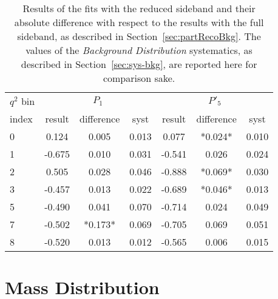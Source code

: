 \begin{table*}[htb]
  \caption{Results of the fits with the reduced sideband and their absolute difference with respect to the results with the full sideband, as described in Section~\ref{sec:partRecoBkg}.
    The values of the \textit{Background Distribution} systematics, as described in Section~\ref{sec:sys-bkg}, are reported here for comparison sake.\label{tab:red-sideband}}
          {\small
            \begin{center}
              \begin{tabular}{l|ccc|ccc}
                $q^2$ bin & \multicolumn{3}{c}{$P_1$} & \multicolumn{3}{c}{$P'_5$} \\
                index & result & difference & syst & result & difference & syst \\
                \hline
                0 &  0.124 & 0.005 & 0.013 &  0.077 &*0.024*& 0.010 \\
                1 & -0.675 & 0.010 & 0.031 & -0.541 & 0.026 & 0.024 \\
                2 &  0.505 & 0.028 & 0.046 & -0.888 &*0.069*& 0.030 \\
                3 & -0.457 & 0.013 & 0.022 & -0.689 &*0.046*& 0.013 \\
                5 & -0.490 & 0.041 & 0.070 & -0.714 & 0.024 & 0.049 \\
                7 & -0.502 &*0.173*& 0.069 & -0.705 & 0.069 & 0.051 \\
                8 & -0.520 & 0.013 & 0.012 & -0.565 & 0.006 & 0.015 \\
              \end{tabular}
            \end{center}
          }
\end{table*}



\section{Mass Distribution}
\label{sec:sys-mass distribution}



